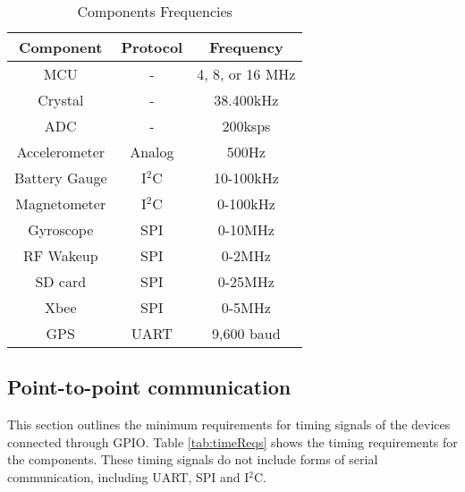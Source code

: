 \begin{table}[H]
  \centering
  \caption{Components Frequencies}
    \begin{tabular}{|c|c|c|}
    \hline
    Component & Protocol & Frequency \\
    \hline \hline
    MCU   & -     & 4, 8, or 16 MHz \\ \hline
    Crystal & -     & 38.400kHz \\ \hline
    ADC   & -     & 200ksps \\ \hline
    Accelerometer & Analog & 500Hz \\ \hline
    Battery Gauge & I$^2$C & 10-100kHz \\ \hline
    Magnetometer & I$^2$C & 0-100kHz \\ \hline
    Gyroscope & SPI   & 0-10MHz \\ \hline
    RF Wakeup & SPI   & 0-2MHz \\ \hline
    SD card & SPI   & 0-25MHz \\ \hline
    Xbee  & SPI   & 0-5MHz \\ \hline
    GPS   & UART  & 9,600 baud \\ \hline
    \end{tabular}%
  \label{tab:compFreq}%
\end{table}%

\subsection{Point-to-point communication}
This section outlines the minimum requirements for timing signals of the devices connected through GPIO. Table \ref{tab:timeReqs} shows the timing requirements for the components. These timing signals do not include forms of serial communication, including UART, SPI and I$^2$C.

